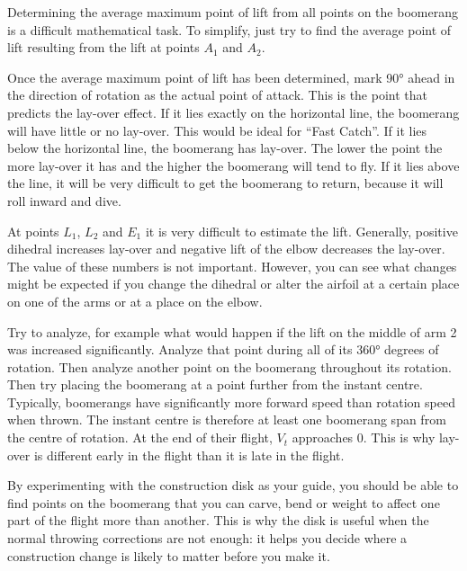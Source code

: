 Determining the average maximum point of lift from all points on the boomerang is a difficult mathematical task. To simplify, just try to find the average point of lift resulting from the lift at points $A_1$ and $A_2$. 

Once the average maximum point of lift has been determined, mark 90° ahead in the direction of rotation as the actual point of attack. This is the point that predicts the lay-over effect. If it lies exactly on the horizontal line, the boomerang will have little or no lay-over. This would be ideal for ``Fast Catch''. If it lies below the horizontal line, the boomerang has lay-over. The lower the point the more lay-over it has and the higher the boomerang will tend to fly. If it lies above the line, it will be very difficult to get the boomerang to return, because it will roll inward and dive.

At points $L_1$, $L_2$ and $E_1$ it is very difficult to estimate the lift. Generally, positive dihedral increases lay-over and negative lift of the elbow decreases the lay-over. The value of these numbers is not important. However, you can see what changes might be expected if you change the dihedral or alter the airfoil at a certain place on one of the arms or at a place on the elbow. 

Try to analyze, for example what would happen if the lift on the middle of arm 2 was increased significantly. Analyze that point during all of its 360° degrees of rotation. Then analyze another point on the boomerang throughout its rotation. Then try placing the boomerang at a point further from the instant centre. Typically, boomerangs have significantly more forward speed than rotation speed when thrown. The instant centre is therefore at least one boomerang span from the centre of rotation. At the end of their flight, $V_t$ approaches 0. This is why lay-over is different early in the flight than it is late in the flight.

By experimenting with the construction disk as your guide, you should be able to find points on the boomerang that you can carve, bend or weight to affect one part of the flight more than another. This is why the disk is useful when the normal throwing corrections are not enough: it helps you decide where a construction change is likely to matter before you make it.
